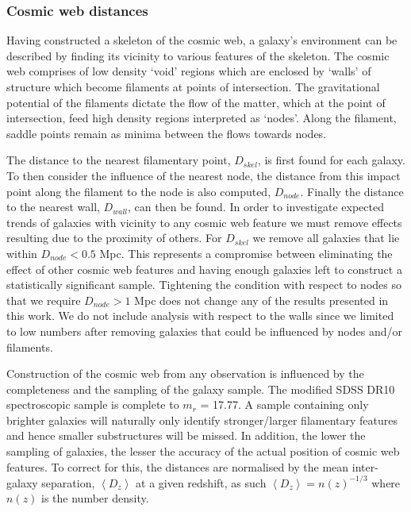 \subsubsection{Cosmic web distances}
Having constructed a skeleton of the cosmic web, a galaxy's environment can be described by finding its vicinity to various features of the skeleton. The cosmic web comprises of low density `void' regions which are enclosed by `walls' of structure which become filaments at points of intersection. The gravitational potential of the filaments dictate the flow of the matter, which at the point of intersection, feed high density regions interpreted as `nodes'. Along the filament, saddle points remain as minima between the flows towards nodes.  

The distance to the nearest filamentary point, $D_{skel}$, is first found for each galaxy. To then consider the influence of the nearest node, the distance from this impact point along the filament to the node is also computed, $D_{node}$. Finally the distance to the nearest wall, $D_{wall}$, can then be found. In order to investigate expected trends of galaxies with vicinity to any cosmic web feature we must remove effects resulting due to the proximity of others. For $D_{skel}$ we remove all galaxies that lie within $D_{node} < 0.5$ Mpc. 
This represents a compromise between eliminating the effect of other cosmic web features and having enough galaxies left to construct a statistically significant sample. Tightening the condition with respect to nodes so that we require $D_{node} > 1$ Mpc does not change any of the results presented in this work. 
We do not include analysis with respect to the walls since we limited to low numbers after removing galaxies that could be influenced by nodes and/or filaments.

Construction of the cosmic web from any observation is influenced by the completeness and the sampling of the galaxy sample. The modified SDSS DR10 spectroscopic sample is complete to $m_r$ = 17.77. A sample containing only brighter galaxies will naturally only identify stronger/larger filamentary features and hence smaller substructures will be missed. In addition, the lower the sampling of galaxies, the lesser the accuracy of the actual position of cosmic web features. To correct for this, the distances are normalised by the mean inter-galaxy separation, $\left\langle D_z \right\rangle$ at a given redshift, as such $\left\langle D_z \right\rangle = n(z)^{-1/3}$ where $n(z)$ is the number density. 

